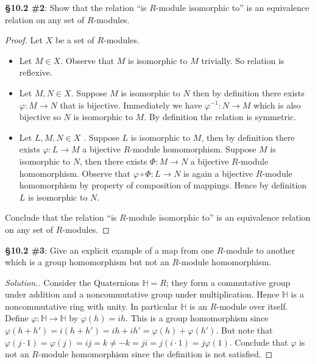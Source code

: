 \documentclass[8pt]{amsart}
\makeatletter
\theoremstyle{plain}%
\theoremstyle{definition}
\theoremstyle{remark}
\numberwithin{equation}{section}
\newenvironment{solution}
               {\let\oldqedsymbol=\qedsymbol%
                \def\@addpunct##1{}%
                \renewcommand{\qedsymbol}{$\blacktriangleleft$}%
                \begin{proof}[\itshape Solution.]}%
               {\end{proof}%
                \renewcommand{\qedsymbol}{\oldqedsymbol}}
\makeatother
\begin{document}
\textbf{\S 10.2 \#2}: Show that the relation ``is $R$-module isomorphic to'' is an equivalence relation on any set of $R$-modules.
	\begin{proof}
		Let $X$ be a set of $R$-modules.
		\begin{itemize}
			\item Let $M \in X$. Observe that $M$ is isomorphic to $M$ trivially. So relation is reflexive.
			\item Let $M, N \in X$. Suppose $M$ is isomorphic to $N$ then by definition there exists $\varphi : M \to N$ that is bijective. Immediately we have $\varphi^{-1} : N \to M$ which is also bijective so $N$ is isomorphic to $M$. By definition the relation is symmetric.
			\item Let $L, M, N \in X$ . Suppose $L$ is isomorphic to $M$, then by definition there exists $\varphi : L \to M$ a bijective $R$-module homomorphism. Suppose $M$ is isomorphic to $N$, then there exists $\Phi : M \to N$ a bijective $R$-module homomorphism. Observe that $\varphi \circ \Phi : L \to N$ is again a bijective $R$-module homomorphism by property of composition of mappings. Hence by definition $L$ is isomorphic to $N$.
		\end{itemize}
		Conclude that the relation ``is $R$-module isomorphic to'' is an equivalence relation on any set of $R$-modules.
	\end{proof}



\textbf{\S 10.2 \#3}: Give an explicit example of a map from one $R$-module to another which is a group homomorphism but not an $R$-module homomorphism.
	\begin{solution}
		Consider the Quaternions $\mathbb H = R$; they form a commutative group under addition and a noncommutative group under multiplication. Hence $\mathbb H$ is a noncommutative ring with unity. In particular $\mathbb H$ is an $R$-module over itself. Define $\varphi : \mathbb H \to \mathbb H$ by $\varphi(h) = ih$. This is a group homomorphism since $\varphi(h + h') = i(h + h') = ih + ih' = \varphi(h) + \varphi(h')$. But note that $\varphi(j \cdot 1) = \varphi(j) = ij = k \neq -k = ji = j(i \cdot 1) = j \varphi(1)$. Conclude that $\varphi$ is not an $R$-module homomorphism since the definition is not satisfied.
	\end{solution}
\end{document}
